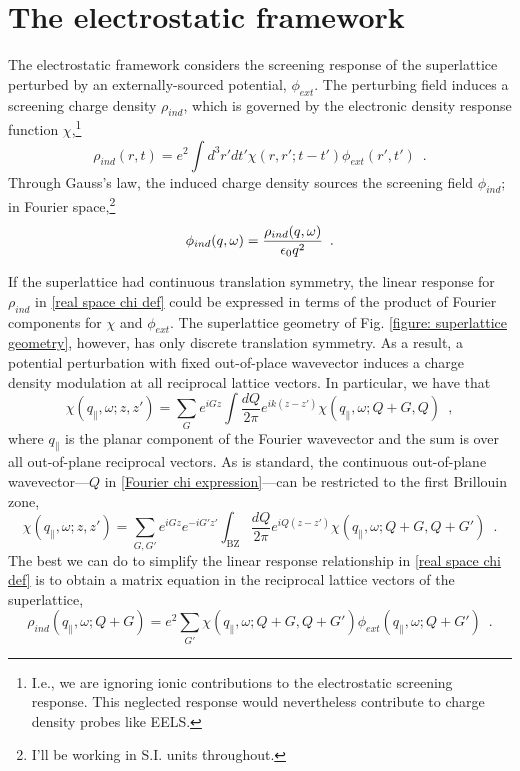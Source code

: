 \section{The electrostatic framework}
\label{section: electrostatic framework}

The electrostatic framework considers the screening response of the superlattice perturbed by an externally-sourced potential, $\phi_{ext}$.  The perturbing field induces a screening charge density $\rho_{ind}$, which is governed by the electronic density response function $\chi$,\footnote{I.e., we are ignoring ionic contributions to the electrostatic screening response.  This neglected response would nevertheless contribute to charge density probes like EELS.}
\begin{equation}
    \label{real space chi def}
    \rho_{ind}(r,t) = e^2\int d^3 r' dt' \chi(r,r';t-t')\phi_{ext}(r',t')
    \,\,\,.
\end{equation}
Through Gauss's law, the induced charge density sources the screening field $\phi_{ind}$; in Fourier space,\footnote{I'll be working in S.I. units throughout.}
\begin{equation}
    \label{Fourier phi ind}
    \phi_{ind}(q,\omega) = \frac{\rho_{ind}(q,\omega)}{\epsilon_0 q^2}
    \,\,\,.
\end{equation}


If the superlattice had continuous translation symmetry, the linear response for $\rho_{ind}$ in \eqref{real space chi def} could be expressed in terms of the product of Fourier components for $\chi$ and $\phi_{ext}$.  The superlattice geometry of Fig. \ref{figure: superlattice geometry}, however, has only discrete translation symmetry.  As a result, a potential perturbation with fixed out-of-place wavevector induces a charge density modulation at all reciprocal lattice vectors.  In particular, we have that
\begin{equation}
    \label{Fourier chi expression}
    \chi(q_\parallel,\omega;z,z') = \sum_G e^{iG z} \int \frac{dQ}{2\pi} e^{ik(z-z')}\chi(q_\parallel,\omega;Q+G,Q)
    \,\,\,,
\end{equation}
where $q_\parallel$ is the planar component of the Fourier wavevector and the sum is over all out-of-plane reciprocal vectors.  As is standard, the continuous out-of-plane wavevector---$Q$ in \eqref{Fourier chi expression}---can be restricted to the first Brillouin zone,
\begin{equation}
    \label{Fourier chi G matrix}
    \chi(q_\parallel,\omega;z,z') = \sum_{G,G'} e^{iG z} e^{-i G' z'} \int_\text{BZ} \frac{dQ}{2\pi} e^{iQ(z-z')}\chi(q_\parallel,\omega;Q+G,Q+G')
    \,\,\,.
\end{equation}
The best we can do to simplify the linear response relationship in \eqref{real space chi def} is to obtain a matrix equation in the reciprocal lattice vectors of the superlattice,
\begin{equation}
    \label{planar linear response}
     \rho_{ind}(q_\parallel,\omega;Q+G) = e^2\sum_{G'}\chi(q_\parallel,\omega;Q+G, Q+G')
     \phi_{ext}(q_\parallel,\omega;Q+G')
     \,\,\,.
\end{equation}

